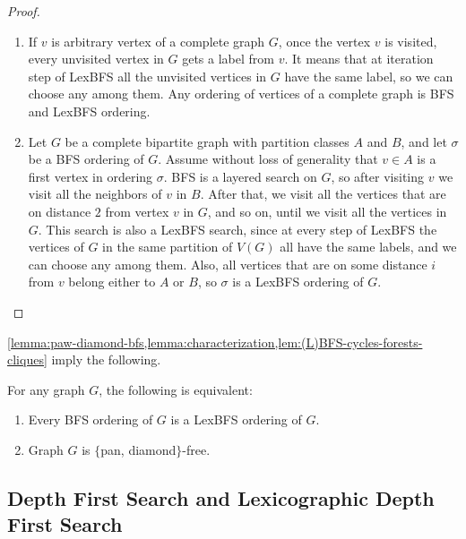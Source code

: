 \documentclass{svproc}
\begin{document}
\begin{proof}
\begin{enumerate}[nosep, label = \roman*)]
\item If $v$ is arbitrary vertex of a complete graph $G$, once the vertex $v$ is visited, every unvisited vertex in $G$ gets a label from $v$. It means that at iteration step of LexBFS all the unvisited vertices in $G$ have the same label, so we can choose any among them. Any ordering of vertices of a complete graph is BFS and LexBFS ordering. 
\item Let $G$ be a complete bipartite graph with partition classes $A$ and $B$, and let $\sigma$ be a BFS ordering of $G$. Assume without loss of generality that $v\in A$ is a first vertex in ordering $\sigma.$ BFS is a layered search on $G$, so after visiting $v$ we visit all the neighbors of $v$ in $B$. After that, we visit all the vertices that are on distance $2$ from vertex $v$ in $G$, and so on, until we visit all the vertices in $G$. This search is also a LexBFS search, since at every step of LexBFS the vertices of $G$ in the same partition of $V(G)$ all have the same labels, and we can choose any among them. Also, all vertices that are on some distance $i$ from $v$ belong either to $A$ or $B$, so $\sigma$ is a LexBFS ordering of $G$. 
\end{enumerate}
\end{proof}

\cref{lemma:paw-diamond-bfs,lemma:characterization,lem:(L)BFS-cycles-forests-cliques} imply the following.

\begin{corollary}\label{cor:(L)BFS}
For any graph $G$, the following is equivalent: 
\begin{enumerate}[nosep, label = \roman*)]
    \item Every BFS ordering of $G$ is a LexBFS ordering of $G$.
    \item Graph $G$ is $\{$pan, diamond$\}$-free.
\end{enumerate}
\end{corollary}

\subsection{Depth First Search and Lexicographic Depth First Search}
\end{document}
